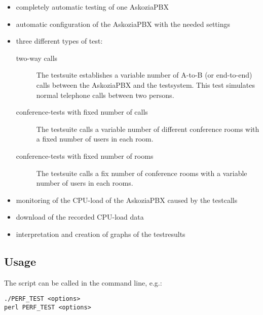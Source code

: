 \begin{itemize}
\item completely automatic testing of one AskoziaPBX
\item automatic configuration of the AskoziaPBX with the needed settings
\item three different types of test:
	\begin{description}
	\item [two-way calls] The testsuite establishes a variable number of A-to-B (or end-to-end) calls between the AskoziaPBX and the testsystem. This test simulates normal telephone calls between two persons.
	
	\item [conference-tests with fixed number of calls] The testsuite calls a variable number of different conference rooms with a fixed number of users in each room.

	\item [conference-tests with fixed number of rooms] The testsuite calls a fix number of conference rooms with a variable number of users in each rooms.
	\end{description}
	
\item monitoring of the CPU-load of the AskoziaPBX caused by the testcalls
\item download of the recorded CPU-load data
\item interpretation and creation of graphs of the testresults 
\end{itemize}

\subsection{Usage}%
The script can be called in the command line, e.g.: 

\begin{lstlisting}[breaklines=true,label=code:script-call,caption={Script call} ]
./PERF_TEST <options>
perl PERF_TEST <options>
\end{lstlisting}

